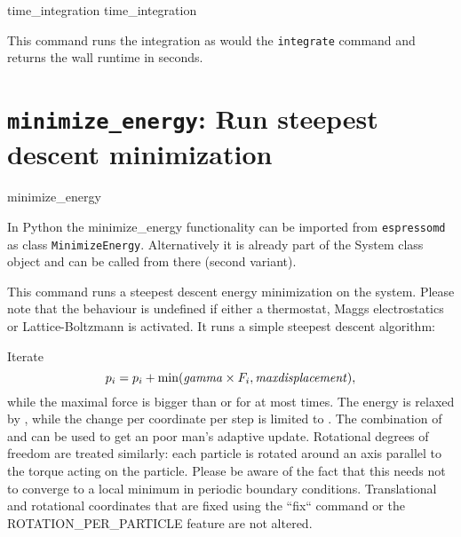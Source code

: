 \begin{essyntax}
   time_integration
   time_integration 
\end{essyntax}

This command runs the integration as would the \texttt{integrate} command and
returns the wall runtime in seconds.

\section{\texttt{minimize_energy}: Run steepest descent minimization}

\begin{essyntax}
   minimize_energy    
\end{essyntax}

\begin{pysyntax}
\end{pysyntax}

In Python the minimize\_energy functionality can be imported from \texttt{espressomd}
as class \texttt{MinimizeEnergy}. Alternatively it is already part of the System
class object and can be called from there (second variant). 

This command runs a steepest descent energy minimization on the system.
Please note that the behaviour is undefined if either a thermostat, Maggs electrostatics or Lattice-Boltzmann is activated.
It runs a simple steepest descent algorithm:

Iterate
$$p_i = p_i + \min(\text{\var{gamma}} \times F_i, \text{\var{maxdisplacement}}),$$
while the maximal force is bigger than  or for at most  times.
The energy is relaxed by , while the change per coordinate per step is limited to .
The combination of  and  can be used to get an poor man's adaptive update.
Rotational degrees of freedom are treated similarly: each particle is rotated around an axis parallel to the torque acting on the particle.
Please be aware of the fact that this needs not to converge to a local minimum in periodic boundary conditions.
Translational and rotational coordinates that are fixed using the ``fix`` command or the ROTATION\_PER\_PARTICLE feature are not altered.

